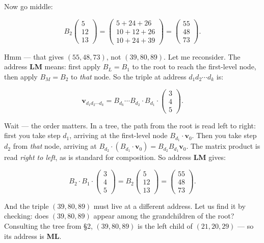 \documentclass[11pt,twoside,openright]{book}
\theoremstyle{definition}
\theoremstyle{remark}
\begin{document}
Now go middle:

\[B_2 \begin{pmatrix} 5 \\ 12 \\ 13 \end{pmatrix} = \begin{pmatrix} 5 + 24 + 26 \\ 10 + 12 + 26 \\ 10 + 24 + 39 \end{pmatrix} = \begin{pmatrix} 55 \\ 48 \\ 73 \end{pmatrix}.\]

Hmm --- that gives $(55, 48, 73)$, not $(39, 80, 89)$. Let me reconsider. The address \textbf{LM} means: first apply $B_L = B_1$ to the root to reach the first-level node, then apply $B_M = B_2$ to \textit{that} node. So the triple at address $d_1 d_2 \cdots d_k$ is:

\[\mathbf{v}_{d_1 d_2 \cdots d_k} = B_{d_k} \cdots B_{d_2} \cdot B_{d_1} \cdot \begin{pmatrix} 3 \\ 4 \\ 5 \end{pmatrix}.\]

Wait --- the order matters. In a tree, the path from the root is read left to right: first you take step $d_1$, arriving at the first-level node $B_{d_1} \cdot \mathbf{v}_0$. Then you take step $d_2$ from \textit{that} node, arriving at $B_{d_2} \cdot (B_{d_1} \cdot \mathbf{v}_0) = B_{d_2} B_{d_1} \mathbf{v}_0$. The matrix product is read \textit{right to left}, as is standard for composition. So address \textbf{LM} gives:

\[B_2 \cdot B_1 \cdot \begin{pmatrix} 3 \\ 4 \\ 5 \end{pmatrix} = B_2 \begin{pmatrix} 5 \\ 12 \\ 13 \end{pmatrix} = \begin{pmatrix} 55 \\ 48 \\ 73 \end{pmatrix}.\]

And the triple $(39, 80, 89)$ must live at a different address. Let us find it by checking: does $(39, 80, 89)$ appear among the grandchildren of the root? Consulting the tree from §2, $(39, 80, 89)$ is the left child of $(21, 20, 29)$ --- so its address is \textbf{ML}.
\end{document}
